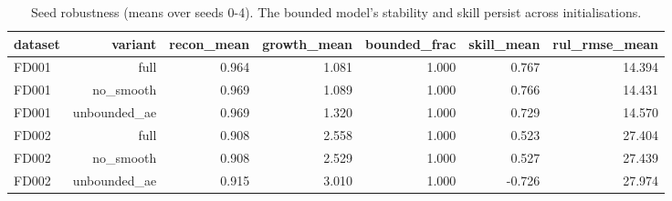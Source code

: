 \begin{table}[t]
\centering
\caption{Seed robustness (means over seeds 0-4). The bounded model's stability and skill persist across initialisations.}
\label{tab:seed_robustness}
\begin{tabular}{lrrrrrr}
\toprule
dataset & variant & recon\_mean & growth\_mean & bounded\_frac & skill\_mean & rul\_rmse\_mean \\
\midrule
FD001 & full & 0.964 & 1.081 & 1.000 & 0.767 & 14.394 \\
FD001 & no\_smooth & 0.969 & 1.089 & 1.000 & 0.766 & 14.431 \\
FD001 & unbounded\_ae & 0.969 & 1.320 & 1.000 & 0.729 & 14.570 \\
FD002 & full & 0.908 & 2.558 & 1.000 & 0.523 & 27.404 \\
FD002 & no\_smooth & 0.908 & 2.529 & 1.000 & 0.527 & 27.439 \\
FD002 & unbounded\_ae & 0.915 & 3.010 & 1.000 & -0.726 & 27.974 \\
\bottomrule
\end{tabular}
\end{table}